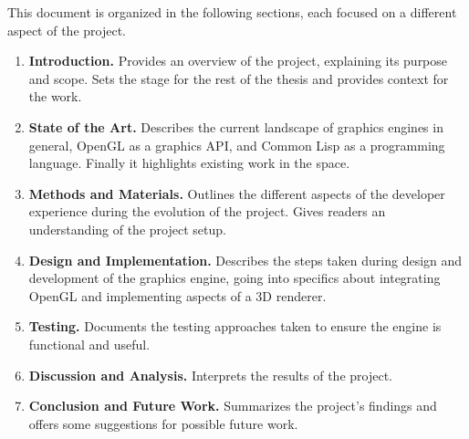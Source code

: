 This document is organized in the following sections, each focused on a different aspect of the project.

\begin{enumerate}
  \item \textbf{Introduction.} Provides an overview of the project, explaining its purpose and scope. Sets the stage for the rest of the thesis and provides context for the work.
  \item \textbf{State of the Art.} Describes the current landscape of graphics engines in general, OpenGL as a graphics API, and Common Lisp as a programming language. Finally it highlights existing work in the space.
  \item \textbf{Methods and Materials.} Outlines the different aspects of the developer experience during the evolution of the project. Gives readers an understanding of the project setup.
  \item \textbf{Design and Implementation.} Describes the steps taken during design and development of the graphics engine, going into specifics about integrating OpenGL and implementing aspects of a 3D renderer.
  \item \textbf{Testing.} Documents the testing approaches taken to ensure the engine is functional and useful.
  \item \textbf{Discussion and Analysis.} Interprets the results of the project.
  \item \textbf{Conclusion and Future Work.} Summarizes the project's findings and offers some suggestions for possible future work.
\end{enumerate}

